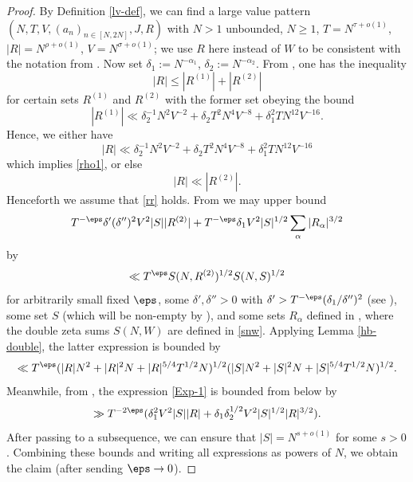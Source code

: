     \begin{proof}  By Definition \ref{lv-def}, we can find a large value pattern $(N,T,V,(a_n)_{n \in [N,2N]},J,R)$ with $N>1$ unbounded, $N \geq 1$, $T = N^{\tau+o(1)}$, $|R| = N^{\rho+o(1)}$, $V = N^{\sigma+o(1)}$; we use $R$ here instead of $W$ to be consistent with the notation from \cite{bourgain_large_2000}.  Now set $\delta_1 := N^{-\alpha_1}$, $\delta_2 := N^{-\alpha_2}$.  From \cite[(4.41), (4.42)]{bourgain_large_2000}, one has the inequality
        $$ |R| \leq |R^{(1)}| + |R^{(2)}|$$
        for certain sets $R^{(1)}$ and $R^{(2)}$ with the former set obeying the bound
    $$ |R^{(1)}| \ll \delta_2^{-1} N^2 V^{-2} + \delta_2 T^2 N^4 V^{-8} + \delta_1^2 T N^{12} V^{-16}.$$
    Hence, we either have
    $$ |R| \ll \delta_2^{-1} N^2 V^{-2} + \delta_2 T^2 N^4 V^{-8} + \delta_1^2 T N^{12} V^{-16}$$
    which implies \eqref{rho1}, or else
    \begin{equation}\label{rr}
        |R| \ll |R^{(2)}|.
    \end{equation}
    Henceforth we assume that \eqref{rr} holds. From \cite[(4.53), (4.54)]{bourgain_large_2000} we may upper bound
    \begin{equation}\label{Exp-1}
         T^{-\eps} \delta' (\delta'')^2 V^2 |S| |R^{(2)}| + T^{-\eps} \delta_1 V^2 |S|^{1/2} \sum_\alpha |R_\alpha|^{3/2}
    \end{equation}
    by
    \begin{equation}\label{Exp-2}
        \ll T^\eps S(N,R^{(2)})^{1/2} S(N,S)^{1/2}
    \end{equation}
    for arbitrarily small fixed $\eps$, some $\delta',\delta''>0$ with $\delta' > T^{-\eps} (\delta_1/\delta'')^2$ (see \cite[(4.37)]{bourgain_large_2000}), some set $S$ (which will be non-empty by \cite[(4.47)]{bourgain_large_2000}), and some sets $R_\alpha$ defined in \cite[(4.39)]{bourgain_large_2000}, where the double zeta sums $S(N,W)$ are defined in \eqref{snw}.  Applying Lemma \ref{hb-double}, the latter expression is bounded by
    $$ \ll T^\eps (|R|N^2 + |R|^2 N + |R|^{5/4} T^{1/2} N)^{1/2} (|S| N^2 + |S|^2 N + |S|^{5/4} T^{1/2} N)^{1/2}.$$
    Meanwhile, from \cite[(4.57)]{bourgain_large_2000}, the expression \eqref{Exp-1} is bounded from below by
    $$ \gg T^{-2\eps} (\delta_1^2 V^2 |S| |R| + \delta_1 \delta_2^{1/2} V^2 |S|^{1/2} |R|^{3/2}).$$
    After passing to a subsequence, we can ensure that $|S| = N^{s+o(1)}$ for some $s > 0$.
    Combining these bounds and writing all expressions as powers of $N$, we obtain the claim (after sending $\eps \to 0$).
    \end{proof}

